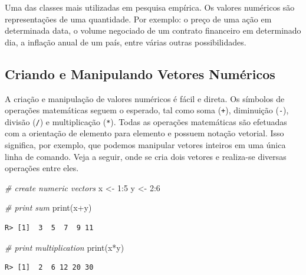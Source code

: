 \documentclass[
  11pt,
]{book}
\newenvironment{Shaded}{\begin{snugshade}}{\end{snugshade}}
\newcommand{\CommentTok}[1]{\textcolor[rgb]{0.37,0.37,0.37}{\textit{#1}}}
\newcommand{\DecValTok}[1]{\textcolor[rgb]{0.06,0.06,0.06}{#1}}
\newcommand{\FunctionTok}[1]{\textcolor[rgb]{0,0,0}{#1}}
\newcommand{\NormalTok}[1]{#1}
\newcommand{\OtherTok}[1]{\textcolor[rgb]{0.37,0.37,0.37}{#1}}
\newcommand{\SpecialCharTok}[1]{\textcolor[rgb]{0,0,0}{#1}}
\begin{document}
Uma das classes mais utilizadas em pesquisa empírica. Os valores numéricos são representações de uma quantidade. Por exemplo: o preço de uma ação em determinada data, o volume negociado de um contrato financeiro em determinado dia, a inflação anual de um país, entre várias outras possibilidades.

\hypertarget{criando-e-manipulando-vetores-numuxe9ricos}{%
\subsection{Criando e Manipulando Vetores Numéricos}\label{criando-e-manipulando-vetores-numuxe9ricos}}

A criação e manipulação de valores numéricos é fácil e direta. Os símbolos de operações matemáticas seguem o esperado, tal como soma (\texttt{+}), diminuição (\texttt{-}), divisão (\texttt{/}) e multiplicação (\texttt{*}). Todas as operações matemáticas são efetuadas com a orientação de elemento para elemento e possuem notação vetorial. Isso significa, por exemplo, que podemos manipular vetores inteiros em uma única linha de comando. Veja a seguir, onde se cria dois vetores e realiza-se diversas operações entre eles.

\begin{Shaded}
\begin{Highlighting}[]
\CommentTok{\# create numeric vectors}
\NormalTok{x }\OtherTok{\textless{}{-}} \DecValTok{1}\SpecialCharTok{:}\DecValTok{5}
\NormalTok{y }\OtherTok{\textless{}{-}} \DecValTok{2}\SpecialCharTok{:}\DecValTok{6}

\CommentTok{\# print sum}
\FunctionTok{print}\NormalTok{(x}\SpecialCharTok{+}\NormalTok{y)}
\end{Highlighting}
\end{Shaded}

\begin{verbatim}
R> [1]  3  5  7  9 11
\end{verbatim}

\begin{Shaded}
\begin{Highlighting}[]
\CommentTok{\# print multiplication}
\FunctionTok{print}\NormalTok{(x}\SpecialCharTok{*}\NormalTok{y)}
\end{Highlighting}
\end{Shaded}

\begin{verbatim}
R> [1]  2  6 12 20 30
\end{verbatim}
\end{document}
